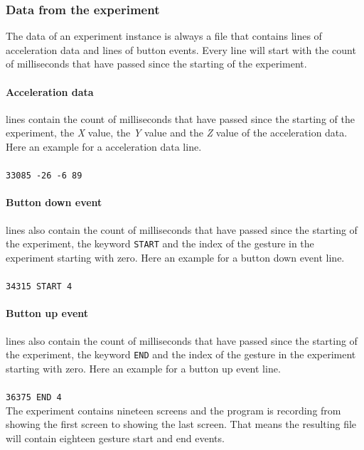 \documentclass[runningheads,a4paper]{llncs}
\begin{document}
    \subsubsection{Data from the experiment}

    The data of an experiment instance is always a file that contains lines of acceleration data and lines of button
    events. Every line will start with the count of milliseconds that have passed since the starting of the experiment.

    \paragraph{Acceleration data} lines contain the count of milliseconds that have passed since the starting of
    the experiment, the \textit{X} value, the \textit{Y} value and the \textit{Z} value of the acceleration data. Here
    an example for a acceleration data line.\\\\
    \verb+33085 -26 -6 89+

    \paragraph{Button down event} lines also contain the count of milliseconds that have passed since the starting
    of the experiment, the keyword \verb+START+ and the index of the gesture in the experiment starting with zero. Here
    an example for a button down event line.\\\\
    \verb+34315 START 4+

    \paragraph{Button up event} lines also contain the count of milliseconds that have passed since the starting
    of the experiment, the keyword \verb+END+ and the index of the gesture in the experiment starting with zero. Here
    an example for a button up event line.\\\\
    \verb+36375 END 4+\\

    The experiment contains nineteen screens and the program is recording from showing the first screen to showing the
    last screen. That means the resulting file will contain eighteen gesture start and end events.

\end{document}
